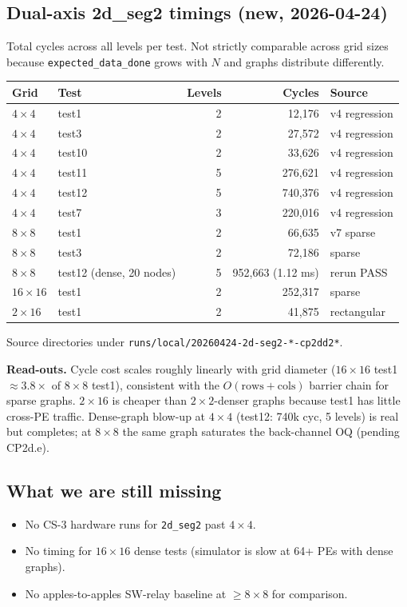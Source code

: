 \documentclass[11pt]{article}
\newcommand{\code}[1]{\texttt{#1}}
\newcommand{\file}[1]{\texttt{#1}}
\begin{document}
\subsection{Dual-axis 2d\_seg2 timings (new, 2026-04-24)}
\label{sec:timing-2d}

Total cycles across all levels per test. Not strictly comparable
across grid sizes because \code{expected\_data\_done} grows with
$N$ and graphs distribute differently.

\begin{center}
\begin{tabular}{l l r r l}
\toprule
Grid & Test & Levels & Cycles & Source \\
\midrule
$4\times 4$ & test1 & 2 & 12,176 & v4 regression \\
$4\times 4$ & test3 & 2 & 27,572 & v4 regression \\
$4\times 4$ & test10 & 2 & 33,626 & v4 regression \\
$4\times 4$ & test11 & 5 & 276,621 & v4 regression \\
$4\times 4$ & test12 & 5 & 740,376 & v4 regression \\
$4\times 4$ & test7 & 3 & 220,016 & v4 regression \\
$8\times 8$ & test1 & 2 & 66,635 & v7 sparse \\
$8\times 8$ & test3 & 2 & 72,186 & sparse \\
$8\times 8$ & test12 (dense, 20 nodes) & 5 & 952{,}663 (1.12 ms) & rerun PASS \\
$16\times 16$ & test1 & 2 & 252,317 & sparse \\
$2\times 16$ & test1 & 2 & 41,875 & rectangular \\
\bottomrule
\end{tabular}
\end{center}

Source directories under
\file{runs/local/20260424-2d-seg2-*-cp2dd2*}.

\textbf{Read-outs.} Cycle cost scales roughly linearly with grid
diameter ($16\times 16$ test1 $\approx 3.8\times$ of $8\times 8$
test1), consistent with the $O(\mathrm{rows} + \mathrm{cols})$
barrier chain for sparse graphs. $2\times 16$ is cheaper than
$2\times 2$-denser graphs because test1 has little cross-PE
traffic. Dense-graph blow-up at $4\times 4$ (test12: 740k cyc, 5
levels) is real but completes; at $8\times 8$ the same graph
saturates the back-channel OQ (pending CP2d.e).

\subsection{What we are still missing}
\begin{itemize}[leftmargin=1.3em,itemsep=0.2em]
  \item No CS-3 hardware runs for \code{2d\_seg2} past $4\times 4$.
  \item No timing for $16\times 16$ dense tests (simulator is
    slow at 64+ PEs with dense graphs).
  \item No apples-to-apples SW-relay baseline at $\ge 8\times 8$
    for comparison.
\end{itemize}
\end{document}
